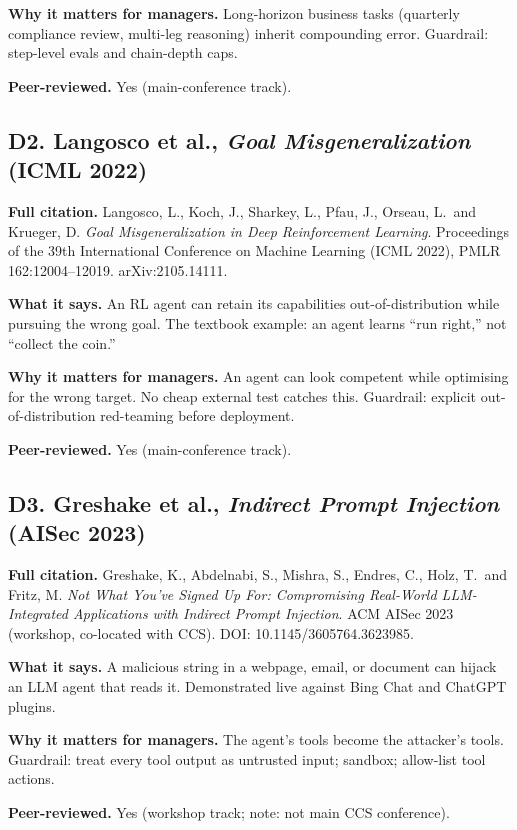\documentclass[11pt,a4paper]{article}
\begin{document}
\textbf{Why it matters for managers.}
Long-horizon business tasks (quarterly compliance review, multi-leg
reasoning) inherit compounding error. Guardrail: step-level evals
and chain-depth caps.

\textbf{Peer-reviewed.} Yes (main-conference track).

\subsection*{D2. Langosco et al., \emph{Goal Misgeneralization} (ICML 2022)}

\textbf{Full citation.}
Langosco, L., Koch, J., Sharkey, L., Pfau, J., Orseau, L.\ and Krueger, D.
\emph{Goal Misgeneralization in Deep Reinforcement Learning}.
Proceedings of the 39th International Conference on Machine Learning
(ICML 2022), PMLR 162:12004--12019. arXiv:2105.14111.

\textbf{What it says.}
An RL agent can retain its capabilities out-of-distribution while
pursuing the wrong goal. The textbook example: an agent learns ``run
right,'' not ``collect the coin.''

\textbf{Why it matters for managers.}
An agent can look competent while optimising for the wrong target.
No cheap external test catches this. Guardrail: explicit
out-of-distribution red-teaming before deployment.

\textbf{Peer-reviewed.} Yes (main-conference track).

\subsection*{D3. Greshake et al., \emph{Indirect Prompt Injection} (AISec 2023)}

\textbf{Full citation.}
Greshake, K., Abdelnabi, S., Mishra, S., Endres, C., Holz, T.\ and Fritz, M.
\emph{Not What You've Signed Up For: Compromising Real-World LLM-Integrated
Applications with Indirect Prompt Injection}. ACM AISec 2023 (workshop,
co-located with CCS). DOI: 10.1145/3605764.3623985.

\textbf{What it says.}
A malicious string in a webpage, email, or document can hijack an LLM
agent that reads it. Demonstrated live against Bing Chat and ChatGPT
plugins.

\textbf{Why it matters for managers.}
The agent's tools become the attacker's tools. Guardrail: treat every
tool output as untrusted input; sandbox; allow-list tool actions.

\textbf{Peer-reviewed.} Yes (workshop track; note: not main CCS
conference).
\end{document}
